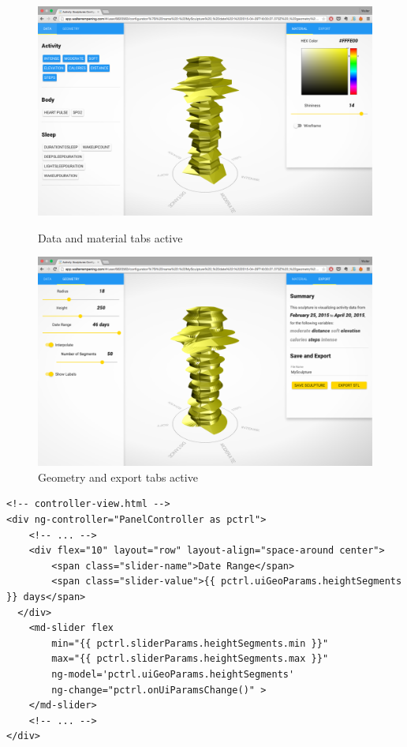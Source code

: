\documentclass[../medieninformatik-arbeit.tex]{subfiles}
\begin{document}
\begin{figure}[t]
\centering
\begin{minipage}{0.45\textwidth}
\centering
	\includegraphics[width=\linewidth]{Configurator/img/configurator-ui_1}
	\caption{Data and material tabs active}
	\label{fig:configui1}
\end{minipage}
\begin{minipage}{0.45\textwidth}
\centering
  \includegraphics[width=\linewidth]{Configurator/img/configurator-ui_2}
  \caption{Geometry and export tabs active}
  \label{fig:configui2}
\end{minipage}
\end{figure}


\begin{lstlisting}[style=htmlcssjs, caption={Example of bidirectional data binding in AngularJS},label=list:ui-binding]
<!-- controller-view.html -->
<div ng-controller="PanelController as pctrl">
	<!-- ... -->
	<div flex="10" layout="row" layout-align="space-around center">
    	<span class="slider-name">Date Range</span>
		<span class="slider-value">{{ pctrl.uiGeoParams.heightSegments }} days</span>
  </div>
	<md-slider flex
		min="{{ pctrl.sliderParams.heightSegments.min }}"
		max="{{ pctrl.sliderParams.heightSegments.max }}"
		ng-model='pctrl.uiGeoParams.heightSegments'
		ng-change="pctrl.onUiParamsChange()" >
	</md-slider>
	<!-- ... -->
</div>
\end{lstlisting}
\end{document}
